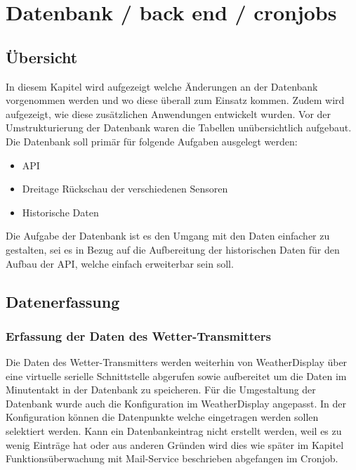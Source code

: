 \section{Datenbank / back end / cronjobs}

\subsection{Übersicht}

In diesem Kapitel wird aufgezeigt welche Änderungen an der Datenbank vorgenommen werden und wo diese überall zum Einsatz kommen. Zudem wird aufgezeigt, wie diese zusätzlichen Anwendungen entwickelt wurden. Vor der Umstrukturierung der Datenbank waren die Tabellen unübersichtlich aufgebaut. Die Datenbank soll primär für folgende Aufgaben ausgelegt werden:\\
\begin{itemize}
\item API
\item Dreitage Rückschau der verschiedenen Sensoren
\item Historische Daten
\end{itemize}

Die Aufgabe der Datenbank ist es den Umgang mit den Daten einfacher zu gestalten, sei es in Bezug auf die Aufbereitung der historischen Daten für den Aufbau der API, welche einfach erweiterbar sein soll.



\subsection{Datenerfassung}
\subsubsection{Erfassung der Daten des Wetter-Transmitters}
Die Daten des Wetter-Transmitters werden weiterhin von WeatherDisplay über eine virtuelle serielle Schnittstelle abgerufen sowie aufbereitet um die Daten im Minutentakt in der Datenbank zu speicheren. Für die Umgestaltung der Datenbank wurde auch die Konfiguration im WeatherDisplay angepasst.  In der Konfiguration können die Datenpunkte welche eingetragen werden sollen selektiert werden.  
\newline
{}\newline
Kann ein Datenbankeintrag nicht erstellt werden, weil es zu wenig Einträge hat oder aus anderen Gründen wird dies wie später im Kapitel Funktionsüberwachung mit Mail-Service beschrieben abgefangen im Cronjob.  

